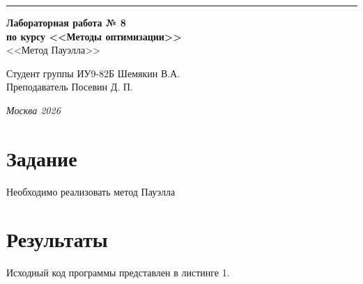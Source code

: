 \documentclass[a4paper, 14pt]{extarticle}
\begin{document}
\begin{titlepage}
\vspace*{-16pt}
\hspace{30pt}\rule{0.866\textwidth}{0.4pt}
  
\vspace{11em}

\begin{center}
\Large {\bf Лабораторная работа № 8} \\ 
\large {\bf по курсу <<Методы оптимизации>>} \\
\large <<Метод Пауэлла>> 
\end{center}\normalsize

\vspace{8em}


\begin{flushright}
  {Студент группы ИУ9-82Б Шемякин В.А. \hspace*{15pt}\\ 
  \vspace{2ex}
  Преподаватель Посевин Д. П.\hspace*{15pt}}
\end{flushright}

\bigskip

\vfill
 

\begin{center}
\textsl{Москва 2026}
\end{center}
\end{titlepage}

\renewcommand{\ttdefault}{pcr}

\setlength{\tabcolsep}{3pt}
\newpage
\setcounter{page}{2}

\section{Задание}\label{Sect::task}
Необходимо реализовать метод Пауэлла
\section{Результаты}\label{Sect::res}

Исходный код программы представлен в листинге 1.
\end{document}

